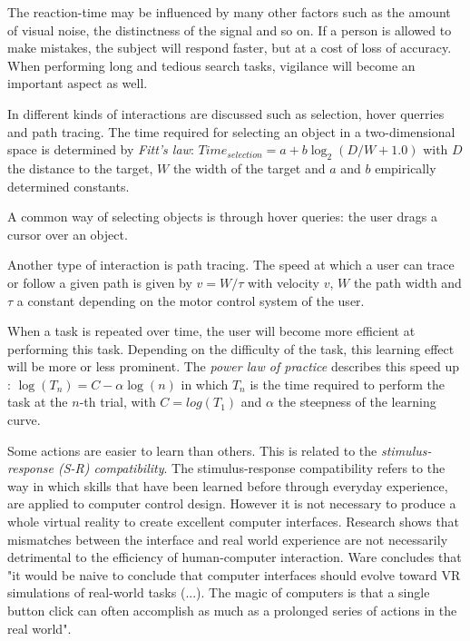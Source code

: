 The reaction-time may be influenced by many other factors such as the amount of visual noise, the distinctness of the signal and so on. If a person is allowed to make mistakes, the subject will respond faster, but at a cost of loss of accuracy\cite{ware:2004}. When performing long and tedious search tasks, vigilance will become an important aspect as well\cite{ware:2004}.

In \cite{ware:2004} different kinds of interactions are discussed such as selection, hover querries and path tracing. The time required for selecting an object in a two-dimensional space is determined by \emph{Fitt's law}: $Time_{selection} = a + b \log_{2}(D/W+1.0)$ with $D$ the distance to the target, $W$ the width of the target and $a$ and $b$ empirically determined constants\cite{ware:2004}.

A common way of selecting objects is through hover queries: the user drags a cursor over an object\cite{ware:2004}.

Another type of interaction is path tracing. The speed at which a user can trace or follow a given path is given by $v = W/\tau$ with velocity $v$, $W$ the path width and $\tau$ a constant depending on the motor control system of the user\cite{ware:2004}.

When a task is repeated over time, the user will become more efficient at performing this task. Depending on the difficulty of the task, this learning effect will be more or less prominent. The \emph{power law of practice} describes this speed up \cite{ware:2004}: $\log(T_{n})=C-\alpha\log(n)$ in which $T_{n}$ is the time required to perform the task at the $n$-th trial, with $C=log(T_{1})$ and $\alpha$ the steepness of the learning curve.

Some actions are easier to learn than others. This is related to the \emph{stimulus-response (S-R) compatibility}. The stimulus-response compatibility refers to the way in which skills that have been learned before through everyday experience, are applied to computer control design. However it is not necessary to produce a whole virtual reality to create excellent computer interfaces. Research shows that mismatches between the interface and real world experience are not necessarily detrimental to the efficiency of human-computer interaction. Ware concludes that "it would be naive to conclude that computer interfaces should evolve toward VR simulations of real-world tasks (...). The magic of computers is that a single button click can often accomplish as much as a prolonged series of actions in the real world"\cite{ware:2004}.


